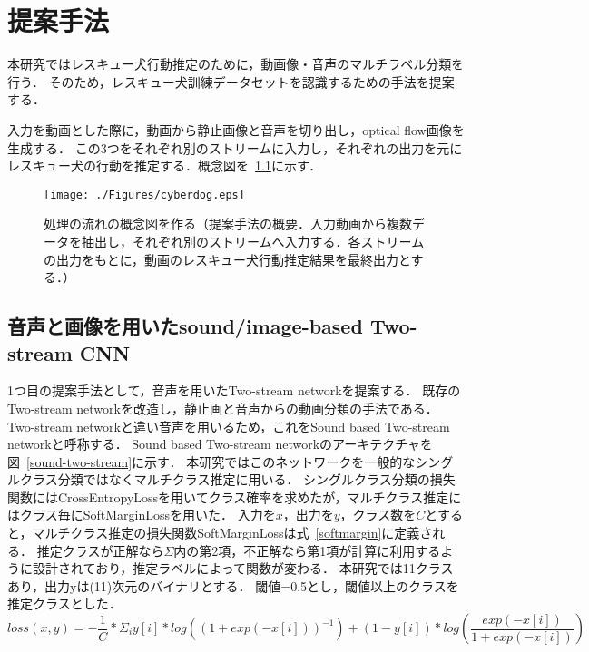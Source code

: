 \chapter{提案手法}
本研究ではレスキュー犬行動推定のために，動画像・音声のマルチラベル分類を行う．
そのため，レスキュー犬訓練データセットを認識するための手法を提案する．

入力を動画とした際に，動画から静止画像と音声を切り出し，optical flow画像を生成する．
この3つをそれぞれ別のストリームに入力し，それぞれの出力を元にレスキュー犬の行動を推定する．概念図を~\ref{easy_image}に示す．
\begin{figure}[H]
 \begin{center}
  \texttt{[image: ./Figures/cyberdog.eps]}
  \caption{処理の流れの概念図を作る（提案手法の概要．入力動画から複数データを抽出し，それぞれ別のストリームへ入力する．各ストリームの出力をもとに，動画のレスキュー犬行動推定結果を最終出力とする．）}
  \label{easy_image}
 \end{center}
\end{figure}

\section{音声と画像を用いたsound/image-based Two-stream CNN}
1つ目の提案手法として，音声を用いたTwo-stream networkを提案する．
既存のTwo-stream networkを改造し，静止画と音声からの動画分類の手法である．
Two-stream networkと違い音声を用いるため，これをSound based Two-stream networkと呼称する．
Sound based Two-stream networkのアーキテクチャを図~\ref{sound-two-stream}に示す．
本研究ではこのネットワークを一般的なシングルクラス分類ではなくマルチクラス推定に用いる．
シングルクラス分類の損失関数にはCrossEntropyLossを用いてクラス確率を求めたが，マルチクラス推定にはクラス毎にSoftMarginLossを用いた．
入力を$x$，出力を$y$，クラス数を$C$とすると，マルチクラス推定の損失関数SoftMarginLossは式~\ref{softmargin}に定義される．
推定クラスが正解なら$\Sigma$内の第2項，不正解なら第1項が計算に利用するように設計されており，推定ラベルによって関数が変わる．
本研究では11クラスあり，出力yは(11)次元のバイナリとする．
閾値=0.5とし，閾値以上のクラスを推定クラスとした．
\begin{equation}
\label{softmargin}
loss(x, y) = -\frac{1}{C} * \Sigma_{i} y[i] * log((1+exp(-x[i]))^{-1}) + (1 - y[i]) * log(\frac{exp(-x[i])}{1+exp(-x[i])})
\end{equation}

